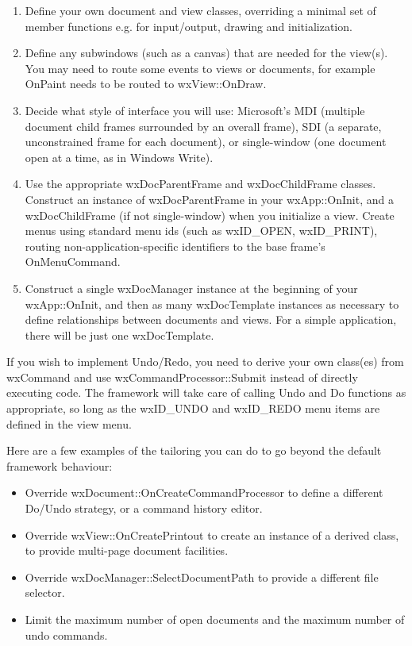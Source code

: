\begin{enumerate}\itemsep=0pt
\item Define your own document and view classes, overriding a minimal set of
member functions e.g. for input/output, drawing and initialization.
\item Define any subwindows
(such as a canvas) that are needed for the view(s). You may need to route some events
to views or documents, for example OnPaint needs to be routed to wxView::OnDraw.
\item Decide what style of interface you will use: Microsoft's MDI (multiple
document child frames surrounded by an overall frame), SDI (a separate, unconstrained frame
for each document), or single-window (one document open at a time, as in Windows Write).
\item Use the appropriate wxDocParentFrame and wxDocChildFrame classes. Construct an instance
of wxDocParentFrame in your wxApp::OnInit, and a wxDocChildFrame (if not single-window) when
you initialize a view. Create menus using standard menu ids (such as wxID\_OPEN, wxID\_PRINT),
routing non-application-specific identifiers to the base frame's OnMenuCommand.
\item Construct a single wxDocManager instance at the beginning of your wxApp::OnInit, and then
as many wxDocTemplate instances as necessary to define relationships between documents and
views. For a simple application, there will be just one wxDocTemplate.
\end{enumerate}

If you wish to implement Undo/Redo, you need to derive your own class(es) from wxCommand
and use wxCommandProcessor::Submit instead of directly executing code. The framework will
take care of calling Undo and Do functions as appropriate, so long as the wxID\_UNDO and
wxID\_REDO menu items are defined in the view menu.

Here are a few examples of the tailoring you can do to go beyond the default framework
behaviour:

\begin{itemize}\itemsep=0pt
\item Override wxDocument::OnCreateCommandProcessor to define a different Do/Undo strategy,
or a command history editor.
\item Override wxView::OnCreatePrintout to create an instance of a derived \rtfsp
class, to provide multi-page document facilities.
\item Override wxDocManager::SelectDocumentPath to provide a different file selector.
\item Limit the maximum number of open documents and the maximum number of undo commands.
\end{itemize}

